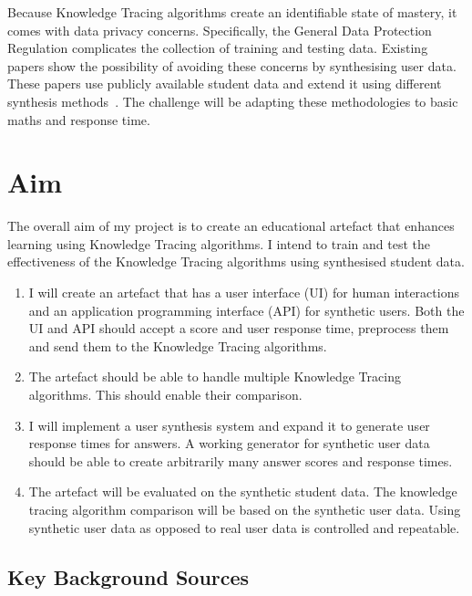 \documentclass[11pt]{article}
\begin{document}
Because Knowledge Tracing algorithms create an identifiable state of mastery, it comes with data privacy concerns. Specifically, the General Data Protection Regulation complicates the collection of training and testing data. Existing papers show the possibility of avoiding these concerns by synthesising user data. These papers use publicly available student data and extend it using different synthesis methods~\autocite{pagonis2024studentsynthesis}. The challenge will be adapting these methodologies to basic maths and response time.

\section{Aim}

The overall aim of my project is to create an educational artefact that enhances learning using Knowledge Tracing algorithms. I intend to train and test the effectiveness of the Knowledge Tracing algorithms using synthesised student data.

\begin{enumerate}
    \item I will create an artefact that has a user interface (UI) for human interactions and an application programming interface (API) for synthetic users. Both the UI and API should accept a score and user response time, preprocess them and send them to the Knowledge Tracing algorithms.
    \item The artefact should be able to handle multiple Knowledge Tracing algorithms. This should enable their comparison.
    \item I will implement a user synthesis system and expand it to generate user response times for answers. A working generator for synthetic user data should be able to create arbitrarily many answer scores and response times.
    \item The artefact will be evaluated on the synthetic student data. The knowledge tracing algorithm comparison will be based on the synthetic user data. Using synthetic user data as opposed to real user data is controlled and repeatable.
\end{enumerate}

\subsection{Key Background Sources}
\end{document}
